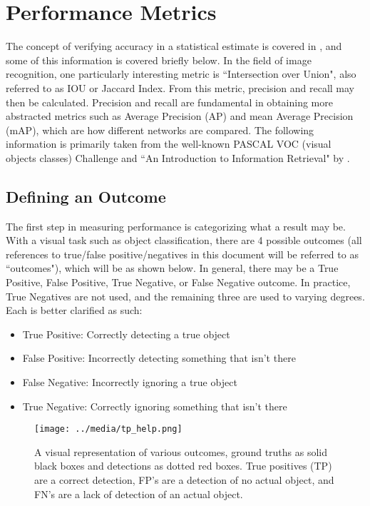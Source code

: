 

\section{Performance Metrics}
\label{appendix_metrics}
The concept of verifying accuracy in a statistical estimate is covered in \cite{manning_introduction_2008}, and some of this information is covered briefly below. In the field of image recognition, one particularly interesting metric is ``Intersection over Union", also referred to as IOU or Jaccard Index. From this metric, precision and recall may then be calculated. Precision and recall are fundamental in obtaining more abstracted metrics such as Average Precision (AP) and mean Average Precision (mAP), which are how different networks are compared. The following information is primarily taken from the well-known PASCAL VOC (visual objects classes) Challenge \cite{everingham_pascal_2010} and ``An Introduction to Information Retrieval" by \cite{manning_introduction_2008}.

\subsection{Defining an Outcome}
The first step in measuring performance is categorizing what a result may be. With a visual task such as object classification, there are 4 possible outcomes (all references to true/false positive/negatives in this document will be referred to as ``outcomes"), which will be  as shown below. In general, there may be a True Positive, False Positive, True Negative, or False Negative outcome. In practice, True Negatives are not used, and the remaining three are used to varying degrees. Each is better clarified as such:
\begin{itemize} \itemsep=-.5em
	\item True Positive: Correctly detecting a true object
	\item False Positive: Incorrectly detecting something that isn't there
	\item False Negative: Incorrectly ignoring a true object
	\item True Negative: Correctly ignoring something that isn't there
\end{itemize}

\begin{figure}[h]
	\centering
	\texttt{[image: ../media/tp\_help.png]}
	\caption{A visual representation of various outcomes, ground truths as solid black boxes and detections as dotted red boxes. True positives (TP) are a correct detection, FP's are a detection of no actual object, and FN's are a lack of detection of an actual object.}
	\label{tp_help} %
\end{figure}

